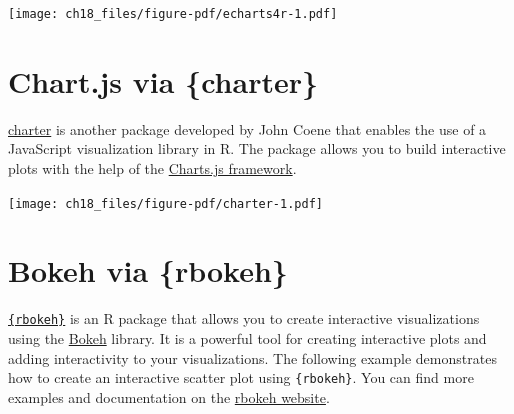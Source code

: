 \documentclass[
  letterpaper,
  DIV=11,
  numbers=noendperiod]{scrreprt}
\newenvironment{Shaded}{\begin{snugshade}}{\end{snugshade}}
\newcommand{\AttributeTok}[1]{\textcolor[rgb]{0.40,0.45,0.13}{#1}}
\newcommand{\DecValTok}[1]{\textcolor[rgb]{0.68,0.00,0.00}{#1}}
\newcommand{\DocumentationTok}[1]{\textcolor[rgb]{0.37,0.37,0.37}{\textit{#1}}}
\newcommand{\FunctionTok}[1]{\textcolor[rgb]{0.28,0.35,0.67}{#1}}
\newcommand{\NormalTok}[1]{\textcolor[rgb]{0.00,0.23,0.31}{#1}}
\newcommand{\OtherTok}[1]{\textcolor[rgb]{0.00,0.23,0.31}{#1}}
\newcommand{\SpecialCharTok}[1]{\textcolor[rgb]{0.37,0.37,0.37}{#1}}
\newcommand{\StringTok}[1]{\textcolor[rgb]{0.13,0.47,0.30}{#1}}
\begin{document}
\texttt{[image: ch18\_files/figure-pdf/echarts4r-1.pdf]}

\section{Chart.js via \{charter\}}\label{chart.js-via-charter}

\href{https://github.com/JohnCoene/charter}{charter} is another package
developed by John Coene that enables the use of a JavaScript
visualization library in R. The package allows you to build interactive
plots with the help of the \href{https://www.chartjs.org/}{Charts.js
framework}.

\begin{Shaded}
\end{Shaded}

\texttt{[image: ch18\_files/figure-pdf/charter-1.pdf]}

\section{Bokeh via \{rbokeh\}}\label{bokeh-via-rbokeh}

\href{https://hafen.github.io/rbokeh/}{\texttt{\{rbokeh\}}} is an R
package that allows you to create interactive visualizations using the
\href{https://bokeh.org/}{Bokeh} library. It is a powerful tool for
creating interactive plots and adding interactivity to your
visualizations. The following example demonstrates how to create an
interactive scatter plot using \texttt{\{rbokeh\}}. You can find more
examples and documentation on the
\href{https://hafen.github.io/rbokeh/}{rbokeh website}.
\end{document}
